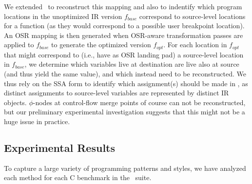 \noindent We extended \tinyvm\ to reconstruct this mapping and also to indentify which program locations in the unoptimized IR version $f_{base}$ correspond to source-level locations for a function (as they would correspond to a possible user breakpoint location). An OSR mapping is then generated when OSR-aware transformation passes are applied to $f_{base}$ to generate the optimized version $f_{opt}$. For each location in $f_{opt}$ that might correspond to (i.e., have as OSR landing pad) a source-level location in $f_{base}$, we determine which variables live at destination are live also at source (and thus yield the same value), and which instead need to be reconstructed. We thus rely on the SSA form to identify which assignment(s) should be made in \reconstruct, as distinct assignments to source-level variables are represented by distinct IR objects. $\phi$-nodes at control-flow merge points of course can not be reconstructed, but our preliminary experimental investigation suggests that this might not be a huge issue in practice. 


\subsection{Experimental Results}
To capture a large variety of programming patterns and styles, we have analyzed each method for each C benchmark in the \speccpu\ suite.


